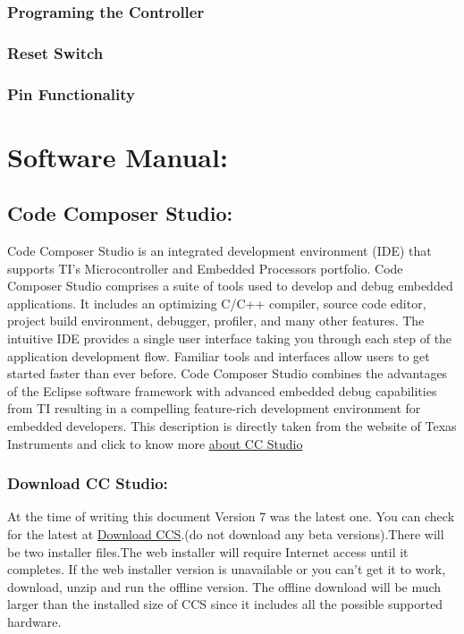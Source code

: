 \documentclass[a4paper,10pt,oneside]{article}
\begin{document}
{	\subsubsection{\huge Programing the Controller}
	\subsubsection{\huge Reset Switch}
	\subsubsection{\huge Pin Functionality}
	\newpage
	\section{\Huge\textbf{Software Manual:}}
		\subsection{\huge \textbf{Code Composer Studio:}}
			{\large Code Composer Studio is an integrated development environment (IDE) that supports TI's Microcontroller and Embedded Processors portfolio. Code Composer Studio comprises a suite of tools used to develop and debug embedded applications. It includes an optimizing C/C++ compiler, source code editor, project build environment, debugger, profiler, and many other features. The intuitive IDE provides a single user interface taking you through each step of the application development flow. Familiar tools and interfaces allow users to get started faster than ever before. Code Composer Studio combines the advantages of the Eclipse software framework with advanced embedded debug capabilities from TI resulting in a compelling feature-rich development environment for embedded developers. This description is directly taken from the website of Texas Instruments and click to know more	\href{http://www.ti.com/tool/ccstudio}{about CC Studio}}}%
			\subsubsection{\Large\textbf{Download CC Studio:}}
			{\large At the time of writing this document Version 7 was the latest one. You can check for the latest at \href{http://processors.wiki.ti.com/index.php/Download_CCS}{Download CCS}.(do not download
				any beta versions).There will be two installer files.The web installer will require Internet access until it	completes. If the web installer version is unavailable or you can’t get it to work,
				download, unzip and run the offline version. The offline download will be much larger
				than the installed size of CCS since it includes all the possible supported hardware.}
\end{document}
